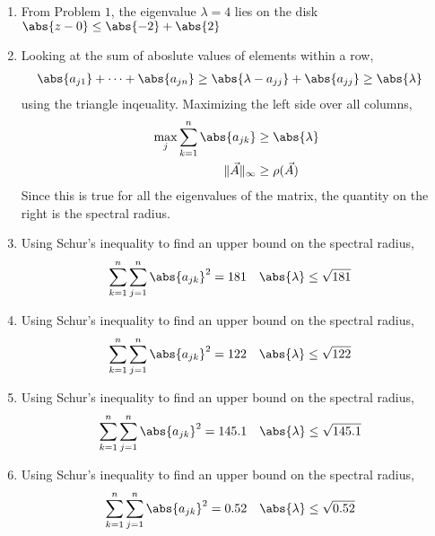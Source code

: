\begin{enumerate}
    \item From Problem $ 1 $, the eigenvalue $ \lambda = 4 $ lies on the disk
          $ \abs{z - 0} \leq \abs{-2} + \abs{2} $

    \item Looking at the sum of aboslute values of elements within a row,
          \begin{align}
              \abs{a_{j1}} + \dots + \abs{a_{jn}} & \geq
              \abs{\lambda - a_{jj}} + \abs{a_{jj}} \geq \abs{\lambda}
          \end{align}
          using the triangle inqeuality. Maximizing the left side over all columns,
          \begin{align}
              \max_j{\sum_{k=1}^{n} \abs{a_{jk}}} & \geq \abs{\lambda} \\
              \lVert \vec{A} \rVert_\infty        & \geq \rho(\vec{A})
          \end{align}
          Since this is true for all the eigenvalues of the matrix, the quantity on the
          right is the spectral radius.

    \item Using Schur's inequality to find an upper bound on the spectral radius,
          \begin{align}
              \sum_{k=1}^{n} \sum_{j=1}^{n} \abs{a_{jk}}^2 & = 181           &
              \abs{\lambda}                                & \leq \sqrt{181}
          \end{align}

    \item Using Schur's inequality to find an upper bound on the spectral radius,
          \begin{align}
              \sum_{k=1}^{n} \sum_{j=1}^{n} \abs{a_{jk}}^2 & = 122           &
              \abs{\lambda}                                & \leq \sqrt{122}
          \end{align}

    \item Using Schur's inequality to find an upper bound on the spectral radius,
          \begin{align}
              \sum_{k=1}^{n} \sum_{j=1}^{n} \abs{a_{jk}}^2 & = 145.1           &
              \abs{\lambda}                                & \leq \sqrt{145.1}
          \end{align}

    \item Using Schur's inequality to find an upper bound on the spectral radius,
          \begin{align}
              \sum_{k=1}^{n} \sum_{j=1}^{n} \abs{a_{jk}}^2 & = 0.52           &
              \abs{\lambda}                                & \leq \sqrt{0.52}
          \end{align}


\end{enumerate}
